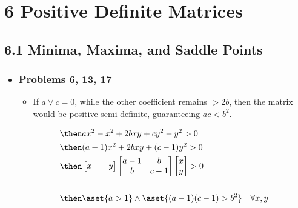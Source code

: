\chapter{6 Positive Definite Matrices}

\section{6.1 Minima, Maxima, and Saddle Points}
\begin{itemize}
  \item []

  \subsection{Problems 6, 13, 17}
  \begin{enumerate}
    \begin{itemize}\color{foreground}
      \item If \(a \lor c = 0\), while the other coefficient remains \(> 2b\),
        then the matrix would be positive semi-definite, guaranteeing \(ac < b^2\).
    \end{itemize}

    \begin{align*}
      &\then ax^2 - x^2 + 2 bxy + cy^2 - y ^2 > 0 \\
      &\then (a-1)x^2 + 2bxy + (c-1)y^2 > 0 \\
      &\then \begin{bmatrix} x && y \end{bmatrix}
      \begin{bmatrix}
        a-1 & b \\
        b & c-1
      \end{bmatrix}
      \begin{bmatrix} x \\ y \end{bmatrix} > 0 \\\\
      &\then \aset{a > 1} \land \aset{(a-1)(c-1) > b^2}\quad \forall x,y
    \end{align*}


\end{enumerate}
\end{itemize}

